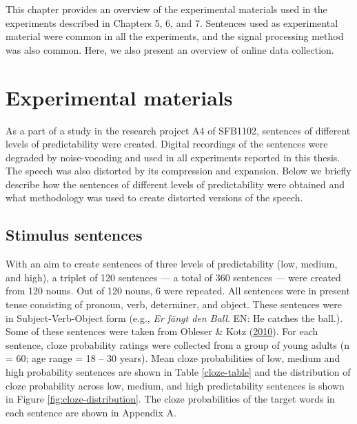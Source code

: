 \documentclass[a4paper, nobind]{templates/ociamthesis}
\renewcommand{\chaptermark}[1]{\markboth{\thechapter. #1}{\thechapter. #1}}
\begin{document}
\chaptermark{Methods}

This chapter provides an overview of the experimental materials used in the experiments described in Chapters 5, 6, and 7.
Sentences used as experimental material were common in all the experiments,
and the signal processing method was also common.
Here, we also present an overview of online data collection.

\hypertarget{experimental-materials}{%
\section{Experimental materials}\label{experimental-materials}}

As a part of a study in the research project A4 of SFB1102, sentences of different levels of predictability were created.
Digital recordings of the sentences were degraded by noise-vocoding and used in all experiments reported in this thesis.
The speech was also distorted by its compression and expansion.
Below we briefly describe how the sentences of different levels of predictability were obtained
and what methodology was used to create distorted versions of the speech.

\hypertarget{stimulus-sentences}{%
\subsection{Stimulus sentences}\label{stimulus-sentences}}

With an aim to create sentences of three levels of predictability (low, medium, and high), a triplet of 120 sentences --- a total of 360 sentences --- were created from 120 nouns.
Out of 120 nouns, 6 were repeated.
All sentences were in present tense consisting of pronoun, verb, determiner, and object.
These sentences were in Subject-Verb-Object form (e.g., \emph{Er fängt den Ball}. EN: He catches the ball.).
Some of these sentences were taken from Obleser \& Kotz (\protect\hyperlink{ref-Obleser2010}{2010}).
For each sentence, cloze probability ratings were collected from a group of young adults (n = 60; age range = 18 -- 30 years).
Mean cloze probabilities of low, medium and high probability sentences are shown in Table \ref{cloze-table} and
the distribution of cloze probability across low, medium, and high predictability sentences is shown in Figure \ref{fig:cloze-distribution}.
The cloze probabilities of the target words in each sentence are shown in Appendix A.
\end{document}
